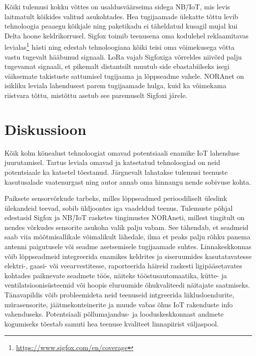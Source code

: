 \documentclass[12pt]{article}
\begin{document}
    Kõiki tulemusi kokku võttes on usaldusväärseima sidega NB\=/IoT, mis levis laitmatult kõikides valitud asukohtades.
    Hea tugijaamade ülekatte tõttu levib tehnoloogia peaaegu kõikjale ning paketikadu ei täheldatud kusagil mujal kui Delta hoone keldrikorrusel.
    Sigfox toimib teenusena oma kodulehel reklaamitavas levialas\footnote{\url{https://www.sigfox.com/en/coverage}} hästi ning edestab tehnoloogiana kõiki teisi oma võimekusega võtta vastu tugevalt hääbunud signaali.
    LoRa vajab Sigfoxiga võrreldes niivõrd palju tugevamat signaali, et pikemalt distantsilt muutub side ebastabiilseks isegi väiksemate takistuste sattumisel tugijaama ja lõppseadme vahele.
    NORAnet on isikliku leviala lahendusest parem tugijaamade hulga, kuid ka võimekama riistvara tõttu, mistõttu asetub see paremuselt Sigfoxi järele.

    \newpage

    \section{Diskussioon}

    Kõik kolm kõnealust tehnoloogiat omavad potentsiaali enamike IoT lahenduse juurutamisel.
    Tartus leviala omavad ja katsetatud tehnoloogiad on neid potentsiaale ka katsetel tõestanud.
    Järgnevalt lahatakse tulemusi teenuste kasutusalade vaatenurgast ning autor annab oma hinnangu nende sobivuse kohta.

    Paiksete sensorvõrkude tarbeks, milles lõppseadmed perioodiliselt üleslink ülekandeid teevad, sobib üldjoontes iga vaadeldud teenus.
    Tulemuste põhjal edestasid Sigfox ja NB\=/IoT rasketes tingimustes NORAneti, millest tingitult on nendes võrkudes sensorite asukoha valik palju vabam.
    See tähendab, et seadmeid saab viia mõõtmisallikale võimalikult lähedale, ilma et peaks palju rõhku panema antenni paigutusele või seadme asetsemisele tugijaamade suhtes.
    Linnakeskkonnas võib lõppseadmeid integreerida enamikes keldrites ja siseruumides kasutatavatesse elektri-, gaasi- või veearvestitesse, raporteerida häireid raskesti ligipääsetavates kohtades paiknevate seadmete töös, näiteks tööstusautomaatika, kütte- ja ventilatsioonisüsteemid või hoopis eluruumide õhukvaliteedi näitajate saatmiseks.
    Tänavapildis võib probleemideta neid teenuseid intgreerida liiklusloendurite, mürasensorite, jäätmekonteinerite ja muude vabas õhus IoT rakenduste info vahenduseks.
    Potentsiaali põllumajandus- ja looduskeskkonnast andmete kogumiseks tõestab samuti hea teenuse kvaliteet linnapiirist väljaspool.
\end{document}
